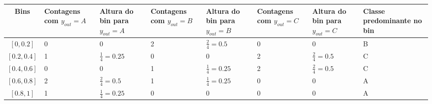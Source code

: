 \documentclass{article}
\begin{document}
\begin{table}[h!]
\centering
\begin{tabular}{|c|w{1.8cm}|w{1.8cm}|w{1.8cm}|w{1.8cm}|w{1.8cm}|w{1.8cm}|w{1.8cm}|}
\hline
Bins & Contagens com $y_{out} = A$ & Altura do bin para $y_{out} = A$ & Contagens com $y_{out} = B$ & Altura do bin para $y_{out} = B$ & Contagens com $y_{out} = C$ & Altura do bin para $y_{out} = C$ & Classe predominante no bin \\ \hline
$[0,0.2]$       &  0             & 0                    & 2 & $\frac{2}{4} = 0.5$    & 0 & 0                   & B \\ \hline
$[0.2,0.4]$     &  1             & $\frac{1}{4} = 0.25$ & 0 & 0                      & 2 & $\frac{2}{4} = 0.5$ & C \\ \hline
$[0.4,0.6]$     &  0             & 0                    & 1 & $\frac{1}{4} = 0.25$   & 2 & $\frac{2}{4} = 0.5$ & C \\ \hline
$[0.6,0.8]$     &  2             & $\frac{2}{4}=0.5$    & 1 & $\frac{1}{4} = 0.25$   & 0 & 0                   & A \\ \hline
$[0.8,1]$       &  1             & $\frac{1}{4} = 0.25$ & 0 & 0                      & 0 & 0                   & A \\ \hline
\end{tabular}
\end{table}
\end{document}
